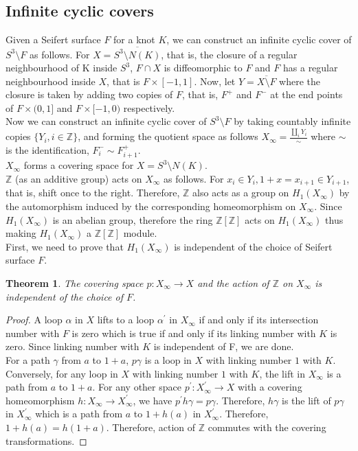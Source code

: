 \documentclass{article}[10pt]
\newtheorem{theorem}{Theorem}[subsection]
\begin{document}
\subsection{Infinite cyclic covers}
Given a Seifert surface $F$ for a knot $K$, we can construct an infinite cyclic cover of $S^{3}\setminus F$ as follows. For $X = \overline{S^{3}\setminus N(K)}$, that is, the closure of a regular neighbourhood of K inside $S^{3}$, $F\cap X$ is diffeomorphic to $F$ and $F$ has a regular neighbourhood inside $X$, that is $F \times [-1,1]$. Now, let $Y = \overline{X \setminus F}$ where the closure is taken by adding two copies of $F$, that is, $F^{+}$ and $F^{-}$ at the end points of $F\times(0,1]$ and $F\times [-1,0)$ respectively.\\
Now we can construct an infinite cyclic cover of $S^{3}\setminus F$ by taking countably infinite copies $\{Y_{i}, i\in \mathbb{Z}\}$, and forming the quotient space as follows $X_{\infty} = \frac{\coprod_{i}Y_{i}}{\sim}$ where $\sim$ is the identification, $F_{i}^{-} \sim F_{i+1}^{+}$.\\
$X_{\infty}$ forms a covering space for $X=S^{3}\setminus N(K)$.\\
$\mathbb{Z}$ (as an additive group) acts on $X_{\infty}$ as follows. For $x_{i} \in Y_{i}, 1 + x = x_{i+1} \in Y_{i+1}$, that is, shift once to the right. Therefore, $\mathbb{Z}$ also acts as a group on $H_{1}(X_{\infty})$ by the automorphism induced by the corresponding homeomorphism on $X_{\infty}$. Since $H_{1}(X_{\infty})$ is an abelian group, therefore the ring $\mathbb{Z}[\mathbb{Z}]$ acts on $H_{1}(X_{\infty})$ thus making $H_{1}(X_{\infty})$ a $\mathbb{Z}[\mathbb{Z}]$ module.\\
First, we need to prove that $H_{1}(X_{\infty})$ is independent of the choice of Seifert surface $F$.
\begin{theorem}
The covering space $p:X_{\infty} \to X$ and the action of $\mathbb{Z}$ on $X_{\infty}$ is independent of the choice of $F$.
\end{theorem}
\begin{proof}
A loop $\alpha$ in $X$ lifts to a loop $\alpha^{\prime}$ in $X_{\infty}$ if and only if its intersection number with $F$ is zero which is true if and only if its linking number with $K$ is zero. Since linking number with $K$ is independent of F, we are done.\\
For a path $\gamma$ from $a$ to $1+a$, $p\gamma$ is a loop in $X$ with linking number $1$ with $K$. Conversely, for any loop in $X$ with linking number $1$ with $K$, the lift in $X_{\infty}$ is a path from $a$ to $1+a$. For any other space $p^{\prime}:X_{\infty}^{\prime}\to X$ with a covering homeomorphism $h:X_{\infty}\to X_{\infty}^{\prime}$, we have $p^{\prime}h\gamma=p\gamma$. Therefore, $h\gamma$ is the lift of $p\gamma$ in $X_{\infty}^{\prime}$ which is a path from $a$ to $1+h(a)$ in $X_{\infty}^{\prime}$. Therefore, $1+h(a)=h(1+a)$. Therefore, action of $\mathbb{Z}$ commutes with the covering transformations.
\end{proof}
\end{document}
